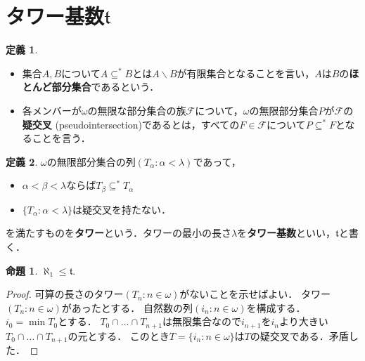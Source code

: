 \documentclass[uplatex,dvipdfmx]{jsarticle}
\newcommand{\frakt}{\mathfrak{t}}
\renewcommand\subset{\subseteq}
\renewcommand{\setminus}{\smallsetminus}
\theoremstyle{definition}
\newtheorem*{defi*}{定義}
\newtheorem{prop}[thm]{命題}
\theoremstyle{named}
\begin{document}
\section{タワー基数$\frakt$}

\begin{defi*}
\begin{itemize}
    \item 集合$A, B$について$A \subset^* B$とは$A \setminus B $が有限集合となることを言い，$A$は$B$の{\bfseries ほとんど部分集合}であるという．
    \item 各メンバーが$\omega$の無限な部分集合の族$\mathcal{F}$について，$\omega$の無限部分集合$P$が$\mathcal{F}$の{\bfseries 疑交叉} (pseudointersection)であるとは，すべての$F \in \mathcal{F}$について$P \subset^* F$となることを言う．
\end{itemize}
\end{defi*}

\begin{defi*}
$\omega$の無限部分集合の列$(T_\alpha : \alpha < \lambda)$であって，
\begin{itemize}
\item $\alpha < \beta < \lambda$ならば$T_\beta \subset^* T_\alpha$
\item $\{T_\alpha : \alpha < \lambda\}$は疑交叉を持たない．
\end{itemize}
を満たすものを{\bfseries タワー}という．タワーの最小の長さ$\lambda$を{\bfseries タワー基数}といい，$\frakt$と書く．
\end{defi*}

\begin{prop}
$\aleph_1 \le \frakt$.
\end{prop}
\begin{proof}
可算の長さのタワー$(T_n : n \in \omega)$がないことを示せばよい．
タワー$(T_n : n \in \omega)$があったとする．
自然数の列$(i_n : n \in \omega)$を構成する．
$i_0 = \min T_0$とする．
$T_0 \cap \dots \cap  T_{n+1}$は無限集合なので$i_{n+1}$を$i_n$より大きい$T_0 \cap \dots \cap  T_{n+1}$の元とする．
このとき$T = \{ i_n : n \in \omega \}$は$T$の疑交叉である．矛盾した．
\end{proof}
\end{document}
